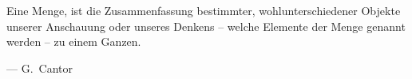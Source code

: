 {
	\setlength{}
	\setlength\epigraphrule{0pt}



\epigraph{Eine Menge, ist die Zusammenfassung bestimmter, wohlunterschiedener Objekte unserer Anschauung oder unseres Denkens -- welche Elemente der Menge genannt werden – zu einem Ganzen.\footnotemark}{--- G.~Cantor}

}